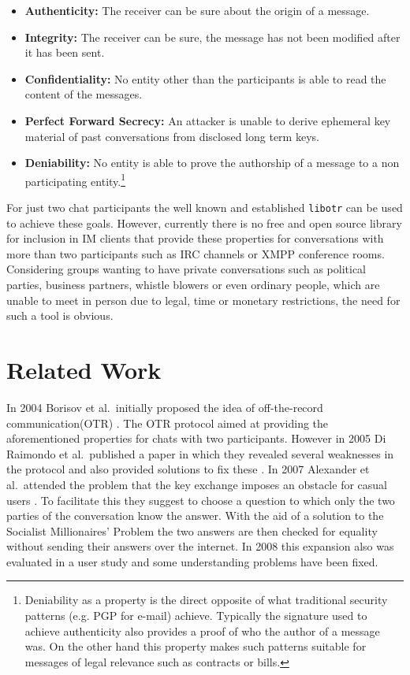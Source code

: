 \begin{itemize}

	\item{\textbf{Authenticity:} The receiver can be sure about the origin of a
		message.}

	\item{\textbf{Integrity:} The receiver can be sure, the message has not been
		modified after it has been sent.}

	\item{\textbf{Confidentiality:} No entity other than the participants is
		able to read the content of the messages.}

	\item{\textbf{Perfect Forward Secrecy:} An attacker is unable to derive
		ephemeral key material of past conversations from disclosed long term keys.}

	\item{\textbf{Deniability:} No entity is able to prove the authorship of a
			message to a non participating entity.\footnote{Deniability as a
				property is the direct opposite of what traditional security
				patterns (e.g. PGP for e-mail) achieve. Typically the signature
		used to achieve authenticity also provides a proof of who the author of
a message was. On the other hand this property makes such patterns suitable for
messages of legal relevance such as contracts or bills.}}

\end{itemize}

For just two chat participants the well known and established \texttt{libotr} can be used
to achieve these goals. However, currently there is no free and open source
library for inclusion in IM clients that provide these properties for
conversations with more than two participants such as IRC channels or XMPP
conference rooms. Considering groups wanting to have private conversations such
as political parties, business partners, whistle blowers or even ordinary people, which are unable to
meet in person due to legal, time or monetary restrictions, the need for such a
tool is obvious.

\section{Related Work}

In 2004 Borisov et al.\ initially proposed the idea of off-the-record
communication(OTR) \cite{otr}. The OTR protocol aimed at providing the
aforementioned properties for chats with two participants. However in 2005 Di
Raimondo et al.\ published a paper in which they revealed several weaknesses in
the protocol and also provided solutions to fix these \cite{sec-otr}. In 2007
Alexander et al.\ attended the problem that the key exchange imposes an obstacle
for casual users \cite{auth-otr}. To facilitate this they suggest to choose a question to which
only the two parties of the conversation know the answer. With the aid of a solution
to the Socialist Millionaires’ Problem the two answers are then checked for equality without sending their answers over the internet.
In 2008 this expansion also was evaluated \cite{user-study} in a user study and some understanding problems have been fixed.

